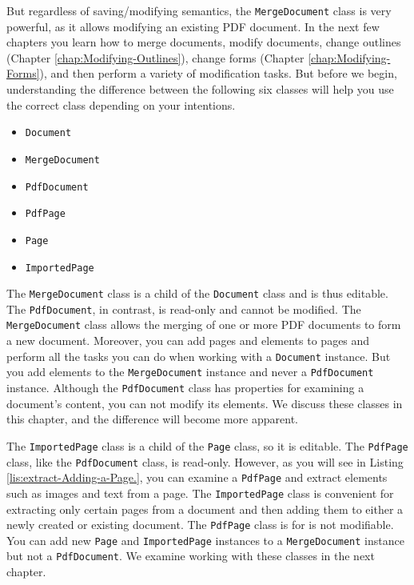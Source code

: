 \documentclass[american]{tufte-book}
\numberwithin{equation}{section}
\numberwithin{figure}{section}
\begin{document}
{{But regardless of saving/modifying semantics, the \texttt{MergeDocument}
class is very powerful, as it allows modifying an existing PDF document.
In the next few chapters you learn how to merge documents, modify
documents, change outlines (Chapter \ref{chap:Modifying-Outlines}),
change forms (Chapter \ref{chap:Modifying-Forms}), and then perform
a variety of modification tasks. But before we begin, understanding
the difference between the following six classes will help you use
the correct class depending on your intentions.
\begin{itemize}
\item \texttt{Document}
\item \texttt{MergeDocument}
\item \texttt{PdfDocument}
\item \texttt{PdfPage }
\item \texttt{Page}
\item \texttt{ImportedPage}
\end{itemize}
The \texttt{MergeDocument} class is a child of the \texttt{Document}
class and is thus editable. The \texttt{PdfDocument}, in contrast,
is read-only and cannot be modified. The \texttt{MergeDocument} class
allows the merging of one or more PDF documents to form a new document.
Moreover, you can add pages and elements to pages and perform all
the tasks you can do when working with a \texttt{Document} instance.
But you add elements to the \texttt{MergeDocument} instance and never
a \texttt{PdfDocument} instance. Although the \texttt{PdfDocument}
class has properties for examining a document's content, you can not
modify its elements. We discuss these classes in this chapter, and
the difference will become more apparent.

The \texttt{ImportedPage} class is a child of the \texttt{Page} class,
so it is editable. The \texttt{PdfPage} class, like the \texttt{PdfDocument}
class, is read-only. However, as you will see in Listing \ref{lis:extract-Adding-a-Page.},
you can examine a \texttt{PdfPage} and extract elements such as images
and text from a page. The \texttt{ImportedPage} class is convenient
for extracting only certain pages from a document and then adding
them to either a newly created or existing document. The \texttt{PdfPage}
class is for is not modifiable. You can add new \texttt{Page} and
\texttt{ImportedPage} instances to a \texttt{MergeDocument} instance
but not a \texttt{PdfDocument}. We examine working with these classes
in the next chapter.

}}
\end{document}
